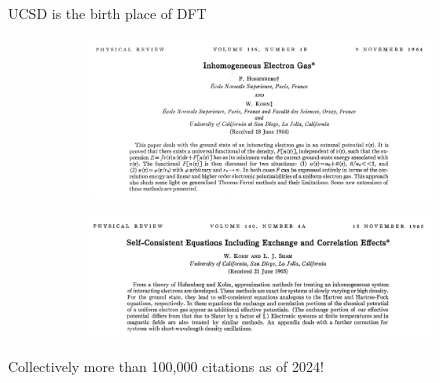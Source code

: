 \documentclass[aspectratio=169]{beamer}
\begin{document}
    \begin{frame}{UCSD is the birth place of DFT}
        \begin{figure}
            \centering
            \begin{subfigure}{0.45\textwidth}
                \includegraphics[width=\linewidth]{lectures/figures/5_DFT_paper1.png}
            \end{subfigure}
            \begin{subfigure}{0.45\textwidth}
                \includegraphics[width=\linewidth]{lectures/figures/5_DFT_paper2.png}
            \end{subfigure}
        \end{figure}
        Collectively more than 100,000 citations as of 2024!
    \end{frame}
\end{document}
